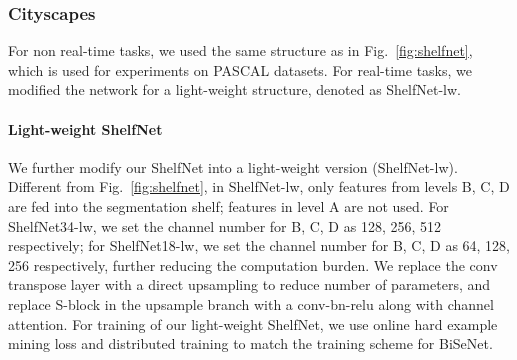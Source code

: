\documentclass[10pt,twocolumn,letterpaper]{article}
\begin{document}
\subsubsection{Cityscapes}

For non real-time tasks, we used the same structure as in Fig.~\ref{fig:shelfnet}, which is used for experiments on PASCAL datasets. For real-time tasks, we modified the network for a light-weight structure, denoted as ShelfNet-lw.

\paragraph{Light-weight ShelfNet}
We further modify our ShelfNet into a light-weight version (ShelfNet-lw). Different from Fig.~\ref{fig:shelfnet}, in ShelfNet-lw, only features from levels B, C, D are fed into the segmentation shelf; features in level A are not used. For ShelfNet34-lw, we set the channel number for B, C, D as 128, 256, 512 respectively; for ShelfNet18-lw, we set the channel number for B, C, D as 64, 128, 256 respectively, further reducing the computation burden. We replace the conv transpose layer with a direct upsampling to reduce number of parameters, and replace S-block in the upsample branch with a conv-bn-relu along with channel attention. For training of our light-weight ShelfNet, we use online hard example mining loss and distributed training to match the training scheme for BiSeNet. 
\vspace{-0.1cm}
\end{document}
